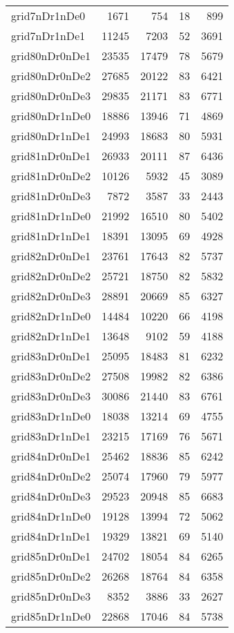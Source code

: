 \begin{longtable}{lrrrr}
grid7nDr1nDe0 & 1671 & 754 & 18 & 899 \\
grid7nDr1nDe1 & 11245 & 7203 & 52 & 3691 \\
grid80nDr0nDe1 & 23535 & 17479 & 78 & 5679 \\
grid80nDr0nDe2 & 27685 & 20122 & 83 & 6421 \\
grid80nDr0nDe3 & 29835 & 21171 & 83 & 6771 \\
grid80nDr1nDe0 & 18886 & 13946 & 71 & 4869 \\
grid80nDr1nDe1 & 24993 & 18683 & 80 & 5931 \\
grid81nDr0nDe1 & 26933 & 20111 & 87 & 6436 \\
grid81nDr0nDe2 & 10126 & 5932 & 45 & 3089 \\
grid81nDr0nDe3 & 7872 & 3587 & 33 & 2443 \\
grid81nDr1nDe0 & 21992 & 16510 & 80 & 5402 \\
grid81nDr1nDe1 & 18391 & 13095 & 69 & 4928 \\
grid82nDr0nDe1 & 23761 & 17643 & 82 & 5737 \\
grid82nDr0nDe2 & 25721 & 18750 & 82 & 5832 \\
grid82nDr0nDe3 & 28891 & 20669 & 85 & 6327 \\
grid82nDr1nDe0 & 14484 & 10220 & 66 & 4198 \\
grid82nDr1nDe1 & 13648 & 9102 & 59 & 4188 \\
grid83nDr0nDe1 & 25095 & 18483 & 81 & 6232 \\
grid83nDr0nDe2 & 27508 & 19982 & 82 & 6386 \\
grid83nDr0nDe3 & 30086 & 21440 & 83 & 6761 \\
grid83nDr1nDe0 & 18038 & 13214 & 69 & 4755 \\
grid83nDr1nDe1 & 23215 & 17169 & 76 & 5671 \\
grid84nDr0nDe1 & 25462 & 18836 & 85 & 6242 \\
grid84nDr0nDe2 & 25074 & 17960 & 79 & 5977 \\
grid84nDr0nDe3 & 29523 & 20948 & 85 & 6683 \\
grid84nDr1nDe0 & 19128 & 13994 & 72 & 5062 \\
grid84nDr1nDe1 & 19329 & 13821 & 69 & 5140 \\
grid85nDr0nDe1 & 24702 & 18054 & 84 & 6265 \\
grid85nDr0nDe2 & 26268 & 18764 & 84 & 6358 \\
grid85nDr0nDe3 & 8352 & 3886 & 33 & 2627 \\
grid85nDr1nDe0 & 22868 & 17046 & 84 & 5738 \\

\end{longtable}
